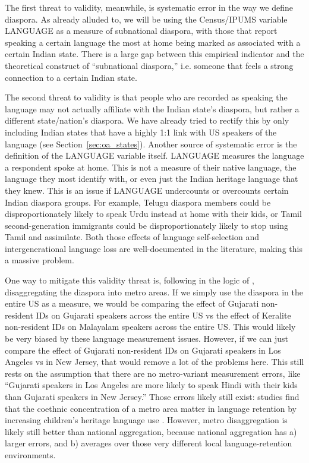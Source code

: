 \documentclass[12pt]{article}
\begin{document}
The first threat to validity, meanwhile, is systematic error in the way we define diaspora. As already alluded to, we will be using the Census/IPUMS variable LANGUAGE as a measure of subnational diaspora, with those that report speaking a certain language the most at home being marked as associated with a certain Indian state. There is a large gap between this empirical indicator and the theoretical construct of ``subnational diaspora,'' i.e. someone that feels a strong connection to a certain Indian state.

The second threat to validity is that people who are recorded as speaking the language may not actually affiliate with the Indian state's diaspora, but rather a different state/nation's diaspora. We have already tried to rectify this by only including Indian states that have a highly 1:1 link with US speakers of the language (see Section~\ref{sec:oa_states}). Another source of systematic error is the definition of the LANGUAGE variable itself. LANGUAGE measures the language a respondent spoke at home. This is not a measure of their native language, the language they most identify with, or even just the Indian heritage language that they knew. This is an issue if LANGUAGE undercounts or overcounts certain Indian diaspora groups. For example, Telugu diaspora members could be disproportionately likely to speak Urdu instead at home with their kids, or Tamil second-generation immigrants could be disproportionately likely to stop using Tamil and assimilate. Both those effects of language self-selection and intergenerational language loss are well-documented in the literature, \citep{escobar_indian_2022} making this a massive problem.

One way to mitigate this validity threat is, following in the logic of \citet{mayda_refugees_2022}, disaggregating the diaspora into metro areas. If we simply use the diaspora in the entire US as a measure, we would be comparing the effect of Gujarati non-resident IDs on Gujarati speakers across the entire US vs the effect of Keralite non-resident IDs on Malayalam speakers across the entire US. This would likely be very biased by these language measurement issues. However, if we can just compare the effect of Gujarati non-resident IDs on Gujarati speakers in Los Angeles vs in New Jersey, that would remove a lot of the problems here. This still rests on the assumption that there are no metro-variant measurement errors, like ``Gujarati speakers in Los Angeles are more likely to speak Hindi with their kids than Gujarati speakers in New Jersey.'' Those errors likely still exist: studies find that the coethnic concentration of a metro area matter in language retention by increasing children's heritage language use \citep{chondrogianni_heritage_2023, white_neighborhood_2017}. However, metro disaggregation is likely still better than national aggregation, because national aggregation has a) larger errors, and b) averages over those very different local language-retention environments. 
\end{document}
